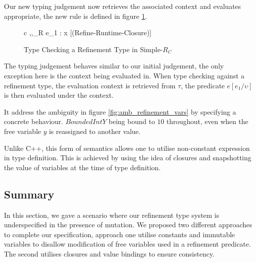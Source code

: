 \documentclass[a4paper,12pt]{report}
\begin{document}
\par
Our new typing judgement now retrieves the associated context 
and evaluates appropriate, the new rule is defined in figure \ref{fig:runtime_refine_closure}. 

\begin{figure}[H]
  \begin{center}
    \begin{tabular}{c}      
      {\Gamma,\sigma,\tau \vdash_{R} e_1 : x } [(Refine-Runtime-Closure)]
    \end{tabular}
  \end{center}
  \caption{Type Checking a Refinement Type in Simple-$R_{C}$}
  \label{fig:runtime_refine_closure}
\end{figure}

\par
The typing judgement behaves similar to our initial judgement, the only 
exception here is the context being evaluated in. When type checking against a 
refinement type, the evaluation context is retrieved from $\tau$, the 
predicate $e[e_1/\upsilon]$ is then evaluated under the context.

\par
It address the ambiguity in figure \ref{fig:amb_refinement_vars} by specifying 
a concrete behaviour. $BoundedIntY$ being bound to $10$ throughout, even when 
the free variable $y$ is reassigned to another value.
 
\par
Unlike C++, this form of semantics allows one to utilise non-constant expression 
in type definition. This is achieved by using the idea of closures and 
snapshotting the value of variables at the time of type definition. 
 
\subsection{Summary}
In this section, we gave a scenario where our refinement type system is 
underspecified in the presence of mutation. We proposed two different approaches 
to complete our specification, approach one utilise constants and immutable 
variables to disallow modification of free variables used in a refinement 
predicate. The second utilises closures and value bindings to ensure 
consistency. 
\end{document}
